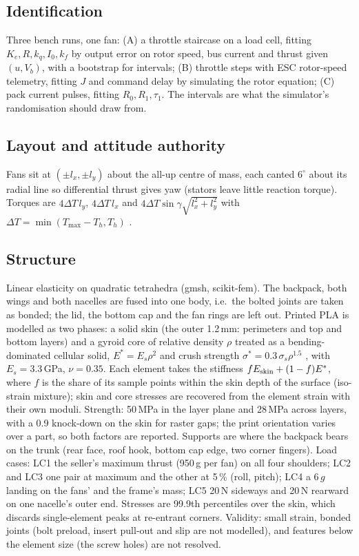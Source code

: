 \documentclass[11pt]{article}
\begin{document}
\subsection{Identification}\label{sec:sysid}
Three bench runs, one fan: (A) a throttle staircase on a load cell, fitting $K_e, R, k_q, I_0, k_f$
by output error on rotor speed, bus current and thrust given $(u,V_b)$, with a bootstrap for
intervals; (B) throttle steps with ESC rotor-speed telemetry, fitting $J$ and command delay by
simulating the rotor equation; (C) pack current pulses, fitting $R_0, R_1, \tau_1$. The intervals
are what the simulator's randomisation should draw from.

\subsection{Layout and attitude authority}
Fans sit at $(\pm l_x,\pm l_y)$ about the all-up centre of mass, each canted $6^\circ$ about its
radial line so differential thrust gives yaw (stators leave little reaction torque). Torques are
$4\Delta T\,l_y$, $4\Delta T\,l_x$ and $4\Delta T\sin\gamma\sqrt{l_x^2+l_y^2}$ with
$\Delta T=\min(T_{\max}-T_h, T_h)$ \cite{mahony}.

\subsection{Structure}
Linear elasticity on quadratic tetrahedra (gmsh, scikit-fem). The backpack, both wings and both nacelles are fused
into one body, i.e.\ the bolted joints are taken as bonded; the lid, the bottom cap and the fan rings are left
out. Printed PLA is modelled as two phases: a solid skin (the outer 1.2\,mm: perimeters and top and bottom
layers) and a gyroid core of relative density $\rho$ treated as a bending-dominated cellular solid,
$E^*=E_s\rho^2$ and crush strength $\sigma^*=0.3\,\sigma_s\rho^{1.5}$ \cite{gibson}, with $E_s=3.3$\,GPa,
$\nu=0.35$. Each element takes the stiffness $fE_{\rm skin}+(1-f)E^*$, where $f$ is the share of its sample
points within the skin depth of the surface (iso-strain mixture); skin and core stresses are recovered from the
element strain with their own moduli. Strength: 50\,MPa in the layer plane and 28\,MPa across layers, with a 0.9
knock-down on the skin for raster gaps; the print orientation varies over a part, so both factors are reported.
Supports are where the backpack bears on the trunk (rear face, roof hook, bottom cap edge, two corner fingers).
Load cases: LC1 the seller's maximum thrust (950\,g per fan) on all four shoulders; LC2 and LC3 one pair at
maximum and the other at 5\,\% (roll, pitch); LC4 a 6\,$g$ landing on the fans' and the frame's mass; LC5 20\,N
sideways and 20\,N rearward on one nacelle's outer end. Stresses are 99.9th percentiles over the skin, which
discards single-element peaks at re-entrant corners. Validity: small strain, bonded joints (bolt preload, insert
pull-out and slip are not modelled), and features below the element size (the screw holes) are not resolved.
\end{document}
